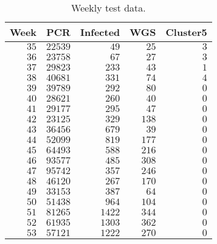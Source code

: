 \begin{table}[tb]
\caption{Weekly test data.\label{tab:summary}} 
\begin{center}
\begin{tabular}{rrrrr}
\hline\hline
\multicolumn{1}{c}{Week}&\multicolumn{1}{c}{PCR}&\multicolumn{1}{c}{Infected}&\multicolumn{1}{c}{WGS}&\multicolumn{1}{c}{Cluster5}\tabularnewline
\hline
$35$&$22539$&$  49$&$ 25$&$3$\tabularnewline
$36$&$23758$&$  67$&$ 27$&$3$\tabularnewline
$37$&$29823$&$ 233$&$ 43$&$1$\tabularnewline
$38$&$40681$&$ 331$&$ 74$&$4$\tabularnewline
$39$&$39789$&$ 292$&$ 80$&$0$\tabularnewline
$40$&$28621$&$ 260$&$ 40$&$0$\tabularnewline
$41$&$29177$&$ 295$&$ 47$&$0$\tabularnewline
$42$&$23125$&$ 329$&$138$&$0$\tabularnewline
$43$&$36456$&$ 679$&$ 39$&$0$\tabularnewline
$44$&$52099$&$ 819$&$177$&$0$\tabularnewline
$45$&$64493$&$ 588$&$216$&$0$\tabularnewline
$46$&$93577$&$ 485$&$308$&$0$\tabularnewline
$47$&$95742$&$ 357$&$246$&$0$\tabularnewline
$48$&$46120$&$ 267$&$170$&$0$\tabularnewline
$49$&$33153$&$ 387$&$ 64$&$0$\tabularnewline
$50$&$51438$&$ 964$&$104$&$0$\tabularnewline
$51$&$81265$&$1422$&$344$&$0$\tabularnewline
$52$&$61935$&$1303$&$362$&$0$\tabularnewline
$53$&$57121$&$1222$&$270$&$0$\tabularnewline
\hline
\end{tabular}\end{center}
\end{table}

